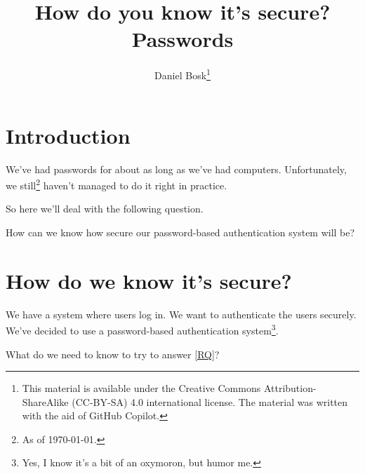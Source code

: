 \title{%
  How do you know it's secure?
  Passwords
}
\author{Daniel Bosk\thanks{%
    This material is available under the Creative Commons 
    Attribution-ShareAlike (CC-BY-SA) 4.0 international license.
    The material was written with the aid of GitHub Copilot.
}}

\begin{frame}
  \maketitle
\end{frame}

\mode*

\begin{abstract}
  
\end{abstract}

\clearpage

\section{Introduction}

\begin{frame}
We've had passwords for about as long as we've had computers.
Unfortunately, we still\footnote{As of \today.} haven't managed to do it right 
in practice.
\end{frame}
So here we'll deal with the following question.

\begin{frame}
  \begin{question}\label{RQ}
    How can we know how secure our password-based authentication system will be?
  \end{question}
\end{frame}


\section{How do we know it's secure?}

\begin{frame}
We have a system where users log in.
We want to authenticate the users securely.
We've decided to use a password-based authentication system\footnote{%
  Yes, I know it's a bit of an oxymoron, but humor me.
}.
\end{frame}

\begin{frame}
  \begin{exercise}
    What do we need to know to try to answer \cref{RQ}?
  \end{exercise}
\end{frame}


